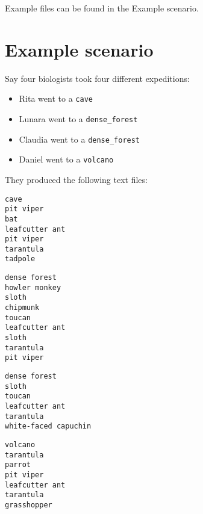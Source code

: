 \documentclass[12pt,letterpaper]{article}
\begin{document}
Example files can be found in the Example scenario.

\section{Example scenario}

Say four biologists took four different expeditions:
\begin{itemize}
    \item Rita went to a \texttt{cave}
    \item Lunara went to a \texttt{dense\_forest}
    \item Claudia went to a \texttt{dense\_forest}
    \item Daniel went to a \texttt{volcano}
\end{itemize}
\vspace{2mm}
They produced the following text files:

\vspace{2mm}
\begin{tcolorbox}[title=cave\_rita.txt]
\begin{lstlisting}[style=textfile]
cave
pit viper
bat
leafcutter ant
pit viper
tarantula
tadpole
\end{lstlisting}
\end{tcolorbox}


\vspace{2mm}
\begin{tcolorbox}[title=dense\_forest\_lunara.txt]
\begin{lstlisting}[style=textfile]
dense forest
howler monkey
sloth
chipmunk
toucan
leafcutter ant
sloth
tarantula
pit viper
\end{lstlisting}
\end{tcolorbox}

\vspace{2mm}
\begin{tcolorbox}[title=dense\_forest\_claudia.txt]
\begin{lstlisting}[style=textfile]
dense forest
sloth
toucan
leafcutter ant
tarantula
white-faced capuchin
\end{lstlisting}
\end{tcolorbox}

\vspace{2mm}
\begin{tcolorbox}[title=volcano\_daniel.txt]
\begin{lstlisting}[style=textfile]
volcano
tarantula
parrot
pit viper
leafcutter ant
tarantula
grasshopper
\end{lstlisting}
\end{tcolorbox}
\end{document}
